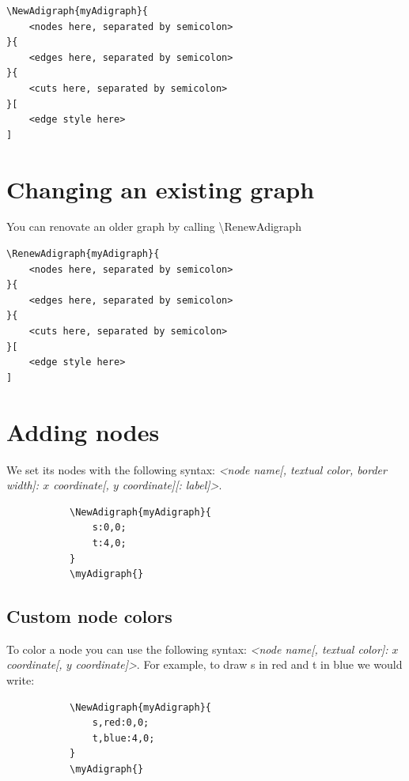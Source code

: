 \documentclass{report}
\begin{document}
\begin{verbatim}
\NewAdigraph{myAdigraph}{
	<nodes here, separated by semicolon>
}{
	<edges here, separated by semicolon>
}{
	<cuts here, separated by semicolon>
}[
	<edge style here>
]
\end{verbatim}

\section{Changing an existing graph}
You can renovate an older graph by calling \textbackslash RenewAdigraph

\begin{verbatim}
\RenewAdigraph{myAdigraph}{
	<nodes here, separated by semicolon>
}{
	<edges here, separated by semicolon>
}{
	<cuts here, separated by semicolon>
}[
	<edge style here>
]
\end{verbatim}

\section{Adding nodes}
We set its nodes with the following syntax: \textit{<node name[, textual color, border width]: \(x\) coordinate[, \(y\) coordinate][: label]>}.

\begin{figure}
	\begin{subfigure}{0.49\textwidth}
		\begin{verbatim}
\NewAdigraph{myAdigraph}{
 	s:0,0;
 	t:4,0;
}
\myAdigraph{}
\end{verbatim}
	\end{subfigure}
	\begin{subfigure}{0.49\textwidth}
		\myAdigraph{}
	\end{subfigure}
\end{figure}

\subsection{Custom node colors}
To color a node you can use the following syntax: \textit{<node name[, textual color]: \(x\) coordinate[, \(y\) coordinate]>}. For example, to draw s in red and t in blue we would write:

\begin{figure}
	\begin{subfigure}{0.49\textwidth}
		\begin{verbatim}
\NewAdigraph{myAdigraph}{
 	s,red:0,0;
 	t,blue:4,0;
}
\myAdigraph{}
\end{verbatim}
	\end{subfigure}
	\begin{subfigure}{0.49\textwidth}
		\myAdigraph{}
	\end{subfigure}
\end{figure}
\end{document}
